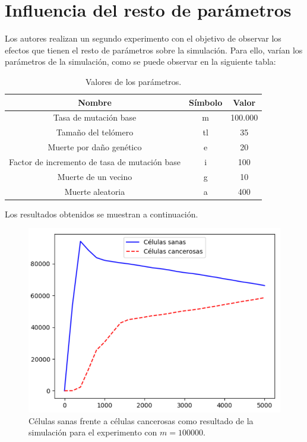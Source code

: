 \section{Influencia del resto de parámetros}

Los autores realizan un segundo experimento con el objetivo de observar los efectos
que tienen el resto de parámetros sobre la simulación. Para ello, varían los parámetros de
la simulación, como se puede observar en la siguiente tabla:

\begin{table}[h!]
  \centering
  \caption{Valores de los parámetros.}
  \label{tab:table1}
  \begin{tabular}{ccc}
    \toprule
    Nombre & Símbolo & Valor\\
    \midrule
    Tasa de mutación base & m & 100.000\\
    Tamaño del telómero & tl & 35\\
    Muerte por daño genético & e & 20\\
    Factor de incremento de tasa de mutación base & i & 100\\
    Muerte de un vecino & g & 10\\
    Muerte aleatoria & a & 400\\
    \bottomrule
  \end{tabular}
\end{table}

Los resultados obtenidos se muestran a continuación.

\begin{figure}[h]
\centering
\includegraphics[scale=0.8]{figures/experiments/exp4/healthvscarcino}
\caption{Células sanas frente a células cancerosas como resultado de la simulación para el experimento con $m = 100000$.}
\end{figure}

